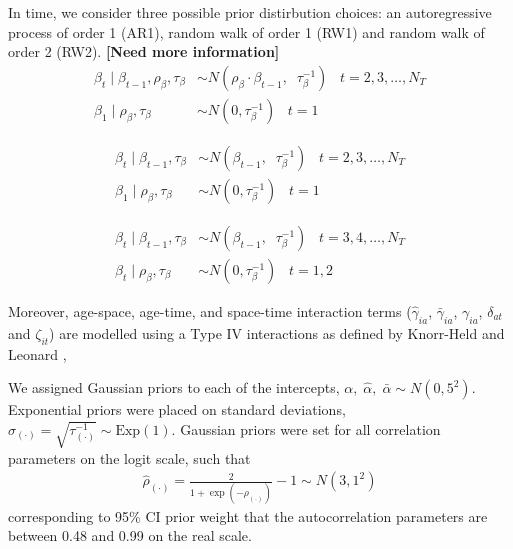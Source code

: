 \documentclass{article}
\begin{document}
\begin{appendix}
In time, we consider three possible prior distirbution choices: an autoregressive process of order 1 (AR1), random walk of order 1 (RW1) and random walk of order 2 (RW2). {\color{red} \bf [Need more information]}
\begin{align*} 
  \beta_{t} \; | \; \beta_{t-1}, \rho_{\beta}, \tau_{\beta} &\sim N(\rho_{\beta} \cdot \beta_{t-1}, \;\; \tau^{-1}_{\beta}) \;\;\;  t = 2, 3,\ldots, N_T \\
  \beta_{1} \; | \; \rho_{\beta}, \tau_{\beta} &\sim N(0, \tau^{-1}_{\beta})  \;\;\;  t = 1
\end{align*}

\begin{align*} 
  \beta_{t} \; | \; \beta_{t-1}, \tau_{\beta} &\sim N(\beta_{t-1}, \;\; \tau^{-1}_{\beta}) \;\;\;  t = 2, 3,\ldots, N_T \\
  \beta_{1} \; | \; \rho_{\beta}, \tau_{\beta} &\sim N(0, \tau^{-1}_{\beta})  \;\;\;  t = 1
\end{align*}

\begin{align*} 
  \beta_{t} \; | \; \beta_{t-1}, \tau_{\beta} &\sim N(\beta_{t-1}, \;\; \tau^{-1}_{\beta}) \;\;\;  t = 3, 4,\ldots, N_T \\
  \beta_{t} \; | \; \rho_{\beta}, \tau_{\beta} &\sim N(0, \tau^{-1}_{\beta})  \;\;\;  t = 1, 2
\end{align*}


Moreover, age-space, age-time, and space-time interaction terms ($\hat{\gamma}_{ia}$, $\bar{\gamma}_{ia}$, $\gamma_{ia}$, $\delta_{at}$ and $\zeta_{it}$) are modelled using a Type IV interactions as defined by Knorr-Held and Leonard \cite{knorr2000bayesian},

We assigned Gaussian priors to each of the intercepts, $\alpha, \;\hat{\alpha}, \;\bar{\alpha} \sim N(0, 5^2)$. Exponential priors were placed on standard deviations, $\sigma_{(\cdot)} = \sqrt{\tau^{-1}_{(\cdot)}} \sim \text{Exp}(1)$. Gaussian priors were set for all correlation parameters on the logit scale, such that 
\begin{align*} 
  \hat{\rho}_{(\cdot)} = \frac{2}{1 + \exp(-\rho_{(\cdot)})} - 1 \sim N(3, 1^2)
\end{align*}
corresponding to 95\% CI prior weight that the autocorrelation parameters are between 0.48 and 0.99 on the real scale.


\end{appendix}
\end{document}
